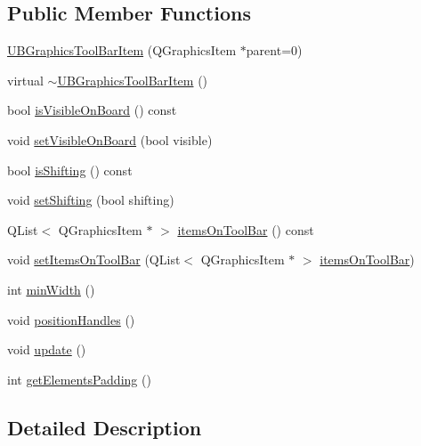 \subsection*{Public Member Functions}
\begin{DoxyCompactItemize}
\item 
\hyperlink{class_u_b_graphics_tool_bar_item_a51e1d0d339367114c70ef2b9cb23eee5}{U\-B\-Graphics\-Tool\-Bar\-Item} (Q\-Graphics\-Item $\ast$parent=0)
\item 
virtual \hyperlink{class_u_b_graphics_tool_bar_item_a3192fce45b655e2d0cfa6e973cfd168c}{$\sim$\-U\-B\-Graphics\-Tool\-Bar\-Item} ()
\item 
bool \hyperlink{class_u_b_graphics_tool_bar_item_a8e37445297c7cb9aa0001554312a001d}{is\-Visible\-On\-Board} () const 
\item 
void \hyperlink{class_u_b_graphics_tool_bar_item_a7463af65640e38f4555ddaa308a1446e}{set\-Visible\-On\-Board} (bool visible)
\item 
bool \hyperlink{class_u_b_graphics_tool_bar_item_ad5c8346dab076b19a05ff0940d945a66}{is\-Shifting} () const 
\item 
void \hyperlink{class_u_b_graphics_tool_bar_item_ab9b66d30fdfa53a2399f4f95f6ef2f15}{set\-Shifting} (bool shifting)
\item 
Q\-List$<$ Q\-Graphics\-Item $\ast$ $>$ \hyperlink{class_u_b_graphics_tool_bar_item_ae2b5628bfd857db66a18129c8a12f81c}{items\-On\-Tool\-Bar} () const 
\item 
void \hyperlink{class_u_b_graphics_tool_bar_item_ac63d42d3f32525ccfc43bac7da080a29}{set\-Items\-On\-Tool\-Bar} (Q\-List$<$ Q\-Graphics\-Item $\ast$ $>$ \hyperlink{class_u_b_graphics_tool_bar_item_ae2b5628bfd857db66a18129c8a12f81c}{items\-On\-Tool\-Bar})
\item 
int \hyperlink{class_u_b_graphics_tool_bar_item_aa6ea0a7ca57f995212b0e50fc13c9988}{min\-Width} ()
\item 
void \hyperlink{class_u_b_graphics_tool_bar_item_afb333932944e51dd53af4d61f4920d76}{position\-Handles} ()
\item 
void \hyperlink{class_u_b_graphics_tool_bar_item_a88a96bf42a11d028087d59eb0a897ca8}{update} ()
\item 
int \hyperlink{class_u_b_graphics_tool_bar_item_aa843a17e8ef3518e0e159272a3d2fd89}{get\-Elements\-Padding} ()
\end{DoxyCompactItemize}


\subsection{Detailed Description}


